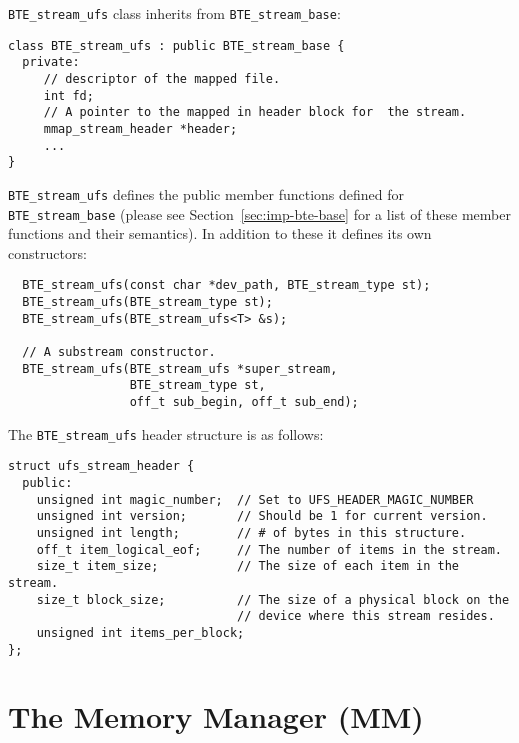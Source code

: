 \lstinline|BTE_stream_ufs| class inherits from
\lstinline|BTE_stream_base|:
\begin{lstlisting}
class BTE_stream_ufs : public BTE_stream_base { 
  private:
     // descriptor of the mapped file.  
     int fd;
     // A pointer to the mapped in header block for  the stream.  
     mmap_stream_header *header; 
     ...  
}
\end{lstlisting}

\lstinline|BTE_stream_ufs| defines the public member
functions defined for \lstinline|BTE_stream_base| (please see
Section~\ref{sec:imp-bte-base} for a list of these member
functions and their semantics).  In addition to these it
defines its own constructors: 
\begin{lstlisting}
  BTE_stream_ufs(const char *dev_path, BTE_stream_type st); 
  BTE_stream_ufs(BTE_stream_type st); 
  BTE_stream_ufs(BTE_stream_ufs<T> &s); 
  
  // A substream constructor.
  BTE_stream_ufs(BTE_stream_ufs *super_stream,
                 BTE_stream_type st,
                 off_t sub_begin, off_t sub_end);
\end{lstlisting}
The \lstinline|BTE_stream_ufs| header structure is as follows:
\begin{lstlisting}
struct ufs_stream_header { 
  public:
    unsigned int magic_number;  // Set to UFS_HEADER_MAGIC_NUMBER
    unsigned int version;       // Should be 1 for current version.
    unsigned int length;        // # of bytes in this structure.
    off_t item_logical_eof;     // The number of items in the stream.
    size_t item_size;           // The size of each item in the stream.
    size_t block_size;          // The size of a physical block on the
                                // device where this stream resides.
    unsigned int items_per_block;
};
\end{lstlisting}




\section{The Memory Manager (MM)}

